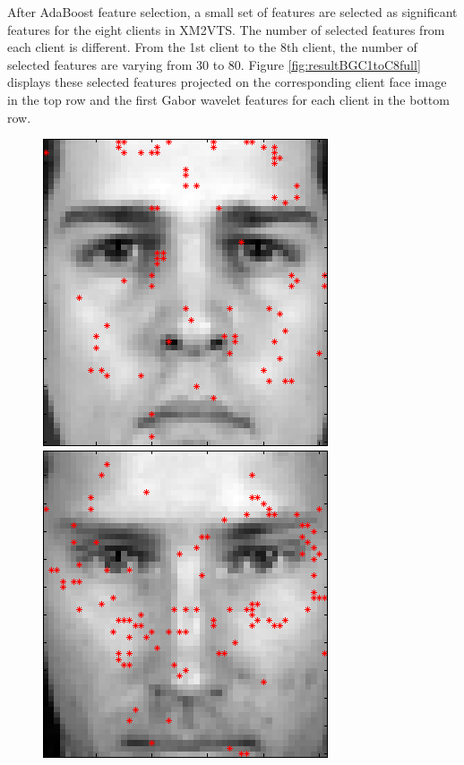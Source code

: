 \documentclass[a4paper,10pt]{article}
\begin{document}
After AdaBoost feature selection, a small set of features are selected as significant features for the eight clients in \mbox{XM2VTS}. The number of selected features from each client is different. From the 1st client to the 8th client, the number of selected features are varying from 30 to 80. \mbox{Figure} \ref{fig:resultBGC1toC8full} displays these selected features projected on the corresponding client face image in the top row and the first Gabor wavelet features for each client in the bottom row. 
\begin{figure}[ht]
 \includegraphics[width=\textwidth*11/100]{figures/XM2VTS_Full_1.png}
 \includegraphics[width=\textwidth*11/100]{figures/XM2VTS_Full_2.png}

\end{figure}
\end{document}

